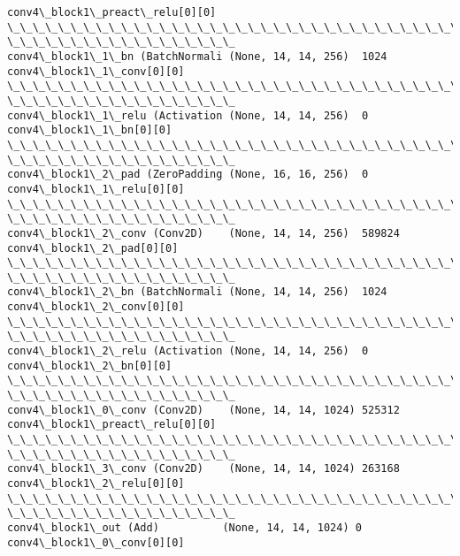 \documentclass[11pt]{article}
\begin{document}
\begin{Verbatim}[commandchars=\\\{\}]
conv4\_block1\_preact\_relu[0][0]
\_\_\_\_\_\_\_\_\_\_\_\_\_\_\_\_\_\_\_\_\_\_\_\_\_\_\_\_\_\_\_\_\_\_\_\_\_\_\_\_\_\_\_\_\_\_\_\_\_\_\_\_\_\_\_\_\_\_\_\_\_\_\_\_\_\_\_\_\_\_\_\_\_\_\_\_\_\_\_\_
\_\_\_\_\_\_\_\_\_\_\_\_\_\_\_\_\_\_
conv4\_block1\_1\_bn (BatchNormali (None, 14, 14, 256)  1024
conv4\_block1\_1\_conv[0][0]
\_\_\_\_\_\_\_\_\_\_\_\_\_\_\_\_\_\_\_\_\_\_\_\_\_\_\_\_\_\_\_\_\_\_\_\_\_\_\_\_\_\_\_\_\_\_\_\_\_\_\_\_\_\_\_\_\_\_\_\_\_\_\_\_\_\_\_\_\_\_\_\_\_\_\_\_\_\_\_\_
\_\_\_\_\_\_\_\_\_\_\_\_\_\_\_\_\_\_
conv4\_block1\_1\_relu (Activation (None, 14, 14, 256)  0
conv4\_block1\_1\_bn[0][0]
\_\_\_\_\_\_\_\_\_\_\_\_\_\_\_\_\_\_\_\_\_\_\_\_\_\_\_\_\_\_\_\_\_\_\_\_\_\_\_\_\_\_\_\_\_\_\_\_\_\_\_\_\_\_\_\_\_\_\_\_\_\_\_\_\_\_\_\_\_\_\_\_\_\_\_\_\_\_\_\_
\_\_\_\_\_\_\_\_\_\_\_\_\_\_\_\_\_\_
conv4\_block1\_2\_pad (ZeroPadding (None, 16, 16, 256)  0
conv4\_block1\_1\_relu[0][0]
\_\_\_\_\_\_\_\_\_\_\_\_\_\_\_\_\_\_\_\_\_\_\_\_\_\_\_\_\_\_\_\_\_\_\_\_\_\_\_\_\_\_\_\_\_\_\_\_\_\_\_\_\_\_\_\_\_\_\_\_\_\_\_\_\_\_\_\_\_\_\_\_\_\_\_\_\_\_\_\_
\_\_\_\_\_\_\_\_\_\_\_\_\_\_\_\_\_\_
conv4\_block1\_2\_conv (Conv2D)    (None, 14, 14, 256)  589824
conv4\_block1\_2\_pad[0][0]
\_\_\_\_\_\_\_\_\_\_\_\_\_\_\_\_\_\_\_\_\_\_\_\_\_\_\_\_\_\_\_\_\_\_\_\_\_\_\_\_\_\_\_\_\_\_\_\_\_\_\_\_\_\_\_\_\_\_\_\_\_\_\_\_\_\_\_\_\_\_\_\_\_\_\_\_\_\_\_\_
\_\_\_\_\_\_\_\_\_\_\_\_\_\_\_\_\_\_
conv4\_block1\_2\_bn (BatchNormali (None, 14, 14, 256)  1024
conv4\_block1\_2\_conv[0][0]
\_\_\_\_\_\_\_\_\_\_\_\_\_\_\_\_\_\_\_\_\_\_\_\_\_\_\_\_\_\_\_\_\_\_\_\_\_\_\_\_\_\_\_\_\_\_\_\_\_\_\_\_\_\_\_\_\_\_\_\_\_\_\_\_\_\_\_\_\_\_\_\_\_\_\_\_\_\_\_\_
\_\_\_\_\_\_\_\_\_\_\_\_\_\_\_\_\_\_
conv4\_block1\_2\_relu (Activation (None, 14, 14, 256)  0
conv4\_block1\_2\_bn[0][0]
\_\_\_\_\_\_\_\_\_\_\_\_\_\_\_\_\_\_\_\_\_\_\_\_\_\_\_\_\_\_\_\_\_\_\_\_\_\_\_\_\_\_\_\_\_\_\_\_\_\_\_\_\_\_\_\_\_\_\_\_\_\_\_\_\_\_\_\_\_\_\_\_\_\_\_\_\_\_\_\_
\_\_\_\_\_\_\_\_\_\_\_\_\_\_\_\_\_\_
conv4\_block1\_0\_conv (Conv2D)    (None, 14, 14, 1024) 525312
conv4\_block1\_preact\_relu[0][0]
\_\_\_\_\_\_\_\_\_\_\_\_\_\_\_\_\_\_\_\_\_\_\_\_\_\_\_\_\_\_\_\_\_\_\_\_\_\_\_\_\_\_\_\_\_\_\_\_\_\_\_\_\_\_\_\_\_\_\_\_\_\_\_\_\_\_\_\_\_\_\_\_\_\_\_\_\_\_\_\_
\_\_\_\_\_\_\_\_\_\_\_\_\_\_\_\_\_\_
conv4\_block1\_3\_conv (Conv2D)    (None, 14, 14, 1024) 263168
conv4\_block1\_2\_relu[0][0]
\_\_\_\_\_\_\_\_\_\_\_\_\_\_\_\_\_\_\_\_\_\_\_\_\_\_\_\_\_\_\_\_\_\_\_\_\_\_\_\_\_\_\_\_\_\_\_\_\_\_\_\_\_\_\_\_\_\_\_\_\_\_\_\_\_\_\_\_\_\_\_\_\_\_\_\_\_\_\_\_
\_\_\_\_\_\_\_\_\_\_\_\_\_\_\_\_\_\_
conv4\_block1\_out (Add)          (None, 14, 14, 1024) 0
conv4\_block1\_0\_conv[0][0]

\end{Verbatim}
\end{document}
